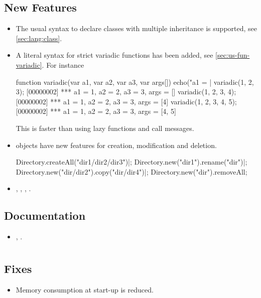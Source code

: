 \subsection{New Features}
\begin{itemize}
\item The usual \Cxx syntax to declare classes with multiple inheritance is
  supported, see \autoref{sec:lang:class}.
\item A literal syntax for strict variadic functions has been added, see
  \autoref{sec:us-fun-variadic}.  For instance
\begin{urbiscript}
function variadic(var a1, var a2, var a3, var args[])
{
  echo("a1 = %
}|
variadic(1, 2, 3);
[00000002] *** a1 = 1, a2 = 2, a3 = 3, args = []
variadic(1, 2, 3, 4);
[00000002] *** a1 = 1, a2 = 2, a3 = 3, args = [4]
variadic(1, 2, 3, 4, 5);
[00000002] *** a1 = 1, a2 = 2, a3 = 3, args = [4, 5]
\end{urbiscript}
  This is faster than using lazy functions and call messages.
\item {} objects have new features for creation,
  modification and deletion.
\begin{urbiscript}
Directory.createAll("dir1/dir2/dir3")|;
Directory.new("dir1").rename("dir")|;
Directory.new("dir/dir2").copy("dir/dir4")|;
Directory.new("dir").removeAll;
\end{urbiscript}
\item {}, ,
  , .
\end{itemize}


\subsection{Documentation}
\begin{itemize}
\item {}, .
\end{itemize}


\section{}

\subsection{Fixes}
\begin{itemize}
\item Memory consumption at start-up is reduced.
\end{itemize}

